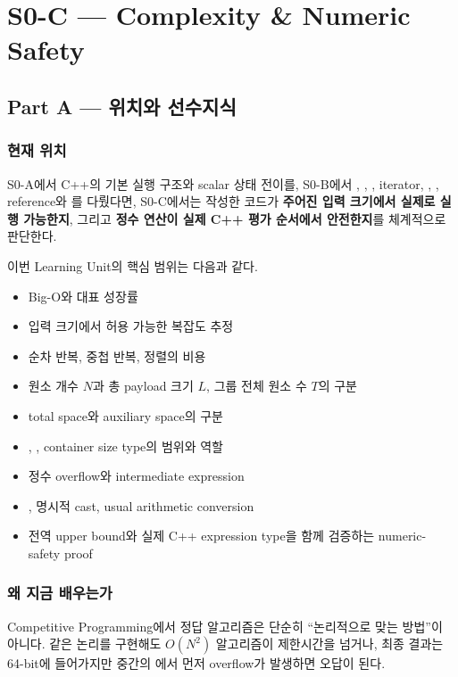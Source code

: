 \chapter{S0-C --- Complexity \& Numeric Safety}

\section{Part A --- 위치와 선수지식}

\subsection{현재 위치}
S0-A에서 C++의 기본 실행 구조와 scalar 상태 전이를, S0-B에서 , , , iterator, , , reference와 를 다뤘다면, S0-C에서는 작성한 코드가 \textbf{주어진 입력 크기에서 실제로 실행 가능한지}, 그리고 \textbf{정수 연산이 실제 C++ 평가 순서에서 안전한지}를 체계적으로 판단한다.

이번 Learning Unit의 핵심 범위는 다음과 같다.
\begin{itemize}
  \item Big-O와 대표 성장률
  \item 입력 크기에서 허용 가능한 복잡도 추정
  \item 순차 반복, 중첩 반복, 정렬의 비용
  \item 원소 개수 $N$과 총 payload 크기 $L$, 그룹 전체 원소 수 $T$의 구분
  \item total space와 auxiliary space의 구분
  \item {}, , container size type의 범위와 역할
  \item 정수 overflow와 intermediate expression
  \item {}, 명시적 cast, usual arithmetic conversion
  \item 전역 upper bound와 실제 C++ expression type을 함께 검증하는 numeric-safety proof
\end{itemize}

\subsection{왜 지금 배우는가}
Competitive Programming에서 정답 알고리즘은 단순히 ``논리적으로 맞는 방법''이 아니다. 같은 논리를 구현해도 $O(N^2)$ 알고리즘이 제한시간을 넘거나, 최종 결과는 64-bit에 들어가지만 중간의 에서 먼저 overflow가 발생하면 오답이 된다.

